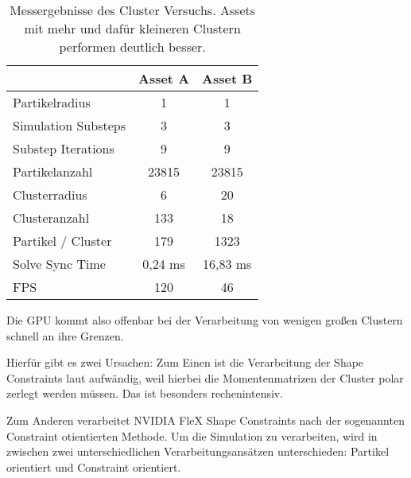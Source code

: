 \begin{table}[hbt!]
\centering
\caption{Messergebnisse des Cluster Versuchs. Assets mit mehr und dafür kleineren Clustern performen deutlich besser.}
\label{table_clusters}
\begin{tabular}{lcc}
                                         & \textbf{Asset A}      & \textbf{Asset B}      \\ \hline
\multicolumn{1}{l|}{Partikelradius}      & 1                     & 1                     \\
\multicolumn{1}{l|}{Simulation Substeps} & 3                     & 3                     \\
\multicolumn{1}{l|}{Substep Iterations}  & 9 					 & 9 				     \\
\multicolumn{1}{l|}{Partikelanzahl}      & 23815                 & 23815                 \\
\multicolumn{1}{l|}{Clusterradius}       & 6                     & 20                    \\
\multicolumn{1}{l|}{Clusteranzahl}       & 133                   & 18                    \\
\multicolumn{1}{l|}{Partikel / Cluster}  & 179                   & 1323                  \\ \hline
\multicolumn{1}{l|}{Solve Sync Time}     & 0,24 ms               & 16,83 ms              \\
\multicolumn{1}{l|}{FPS}                 & 120                   & 46   
\end{tabular}
\end{table}


Die GPU kommt also offenbar bei der Verarbeitung von wenigen großen Clustern schnell an ihre Grenzen.

Hierfür gibt es zwei Ursachen: Zum Einen ist die Verarbeitung der Shape Constraints laut \cite{FlexD3D} aufwändig, weil hierbei die Momentenmatrizen der Cluster polar zerlegt werden müssen. Das ist besonders rechenintensiv.

Zum Anderen verarbeitet NVIDIA FleX Shape Constraints nach der sogenannten Constraint otientierten Methode. Um die Simulation zu verarbeiten, wird in \cite{UPP} zwischen zwei unterschiedlichen Verarbeitungsansätzen unterschieden: Partikel orientiert und Constraint orientiert. 

